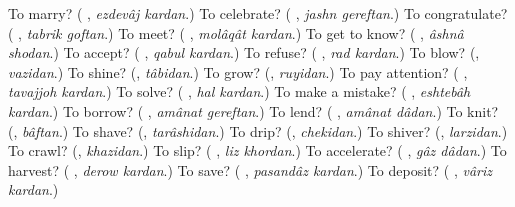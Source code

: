 \begin{tcolorbox}[breakable,colback=teal!4,colframe=teal!35!black,title={Before you move on}]
To marry? (\textbf{ }, \emph{ezdevâj kardan}.) To celebrate? (\textbf{ }, \emph{jashn gereftan}.) To congratulate? (\textbf{ }, \emph{tabrik goftan}.) To meet? (\textbf{ }, \emph{molâqât kardan}.) To get to know? (\textbf{ }, \emph{âshnâ shodan}.) To accept? (\textbf{ }, \emph{qabul kardan}.) To refuse? (\textbf{ }, \emph{rad kardan}.) To blow? (\textbf{}, \emph{vazidan}.) To shine? (\textbf{}, \emph{tâbidan}.) To grow? (\textbf{}, \emph{ruyidan}.) To pay attention? (\textbf{ }, \emph{tavajjoh kardan}.) To solve? (\textbf{ }, \emph{hal kardan}.) To make a mistake? (\textbf{ }, \emph{eshtebâh kardan}.) To borrow? (\textbf{ }, \emph{amânat gereftan}.) To lend? (\textbf{ }, \emph{amânat dâdan}.) To knit? (\textbf{}, \emph{bâftan}.) To shave? (\textbf{}, \emph{tarâshidan}.) To drip? (\textbf{}, \emph{chekidan}.) To shiver? (\textbf{}, \emph{larzidan}.) To crawl? (\textbf{}, \emph{khazidan}.) To slip? (\textbf{ }, \emph{liz khordan}.) To accelerate? (\textbf{ }, \emph{gâz dâdan}.) To harvest? (\textbf{ }, \emph{derow kardan}.) To save? (\textbf{  }, \emph{pasandâz kardan}.) To deposit? (\textbf{ }, \emph{vâriz kardan}.)
\end{tcolorbox}
